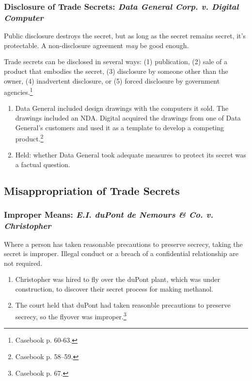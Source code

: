 \subsubsection{Disclosure of Trade Secrets: \emph{Data General Corp. v. 
Digital Computer}}

Public disclosure destroys the secret, but as long as the secret remains 
secret, it's protectable. A non-disclosure agreement \emph{may} be good 
enough.

Trade secrets can be disclosed in several ways: (1) publication, (2) sale of a 
product that embodies the secret, (3) disclosure by someone other than the 
owner, (4) inadvertent disclosure, or (5) forced disclosure by government 
agencies.\footnote{Casebook p. 60-63.}

\begin{enumerate}
    \item Data General included design drawings with the computers it sold. 
    The drawings included an NDA. Digital acquired the drawings from one of 
    Data General's customers and used it as a template to develop a competing 
    product.\footnote{Casebook p. 58--59.}
    \item Held: whether Data General took adequate measures to protect its 
    secret was a factual question.
\end{enumerate}

\subsection{Misappropriation of Trade Secrets}

\subsubsection{Improper Means: \emph{E.I. duPont de Nemours \& Co. v. 
Christopher}}

Where a person has taken reasonable precautions to preserve secrecy, taking 
the secret is improper. Illegal conduct or a breach of a confidential 
relationship are not required.

\begin{enumerate}
    \item Christopher was hired to fly over the duPont plant, which was under 
    construction, to discover their secret process for making methanol.
    \item The court held that duPont had taken reasonble precautions to 
    preserve secrecy, so the flyover was improper.\footnote{Casebook p. 67.}
\end{enumerate}

